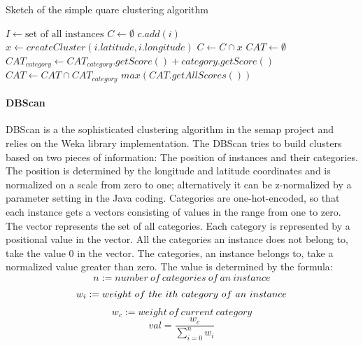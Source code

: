 \begin{algorithm}
\caption{Sketch of the simple quare clustering algorithm}\label{alg:ssca}
\begin{algorithmic} 
\STATE $I \gets \text{set~of~all~instances}$
\STATE $C \gets \emptyset$
  \STATE $c.add(i)$
  \ELSE 
  \STATE $x \gets createCluster(i.latitude, i.longitude)$
  \STATE $C \gets C \cap x$
\ENDIF
\ENDFOR
\ENDFOR
\STATE ${CAT} \gets \emptyset$
\STATE ${CAT}_{category} \gets {CAT}_{category}.getScore() + category.getScore()$
\STATE ${CAT} \gets {CAT} \cap {CAT}_{category}$
\ENDFOR
\ENDFOR
\RETURN $max({CAT}.getAllScores())$
\end{algorithmic}
\end{algorithm}

\paragraph{DBScan}
DBScan is a the sophisticated clustering algorithm in the semap project and relies on the Weka library implementation. The DBScan tries to build clusters based on two pieces of information: The position of instances and their categories. The position is determined by the longitude and latitude coordinates and is normalized on a scale from zero to one; alternatively it can be z-normalized by a parameter setting in the Java coding. Categories are one-hot-encoded, so that each instance gets a vectors consisting of values in the range from one to zero. The vector represents the set of all categories. Each category is represented by a positional value in the vector. All the categories an instance does not belong to, take the value 0 in the vector. The categories, an instance belongs to, take a normalized value greater than zero. The value is determined by the formula: 
\begin{equation}
n := number~of~categories~of~an~instance
\end{equation}
\begin{equation}
w_i := weight~of~the~i\-th~category~of~an~instance
\end{equation}
\begin{equation}
w_c := weight~of~current~category
\end{equation}
\begin{equation}\label{eq:normalization}
val = \frac{w_c}{\sum_{i=0}^{n}w_i}
\end{equation}


